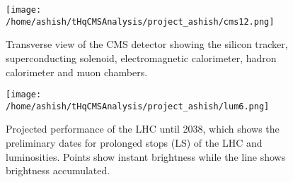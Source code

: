 \documentclass[final,3p]{CSP}
\begin{document}
\begin{figure}
  \centering
   \texttt{[image: /home/ashish/tHqCMSAnalysis/project\_ashish/cms12.png]}
  \caption{Transverse view of the CMS detector showing the silicon tracker, superconducting solenoid, electromagnetic calorimeter, hadron calorimeter and muon chambers.}
   \label{figure 6}
\end{figure}

\begin{figure}
  \centering
  \texttt{[image: /home/ashish/tHqCMSAnalysis/project\_ashish/lum6.png]}
  \caption{\onehalfspacing Projected performance of the LHC until 2038, which shows the preliminary dates for prolonged stops (LS) of the LHC and luminosities. Points
show instant brightness while the line shows brightness accumulated.}
   \label{figure 7}
\end{figure}
\end{document}

